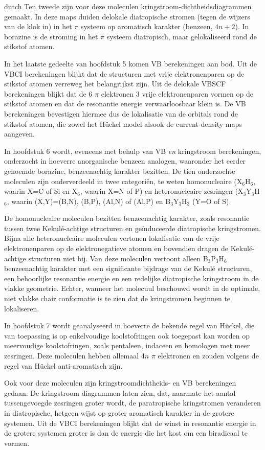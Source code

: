 \begin{otherlanguage*}{dutch}
Ten tweede zijn voor deze moleculen kringstroom-dichtheidsdiagrammen gemaakt. In deze maps duiden delokale diatropische stromen (tegen de wijzers van de klok in) in het $\pi$ systeem op aromatisch karakter (benzeen, $4n+2$). In borazine is de stroming in het $\pi$ systeem diatropisch, maar gelokaliseerd rond de stikstof atomen.

In het laatste gedeelte van hoofdstuk 5 komen VB berekeningen aan bod. Uit de VBCI berekeningen blijkt dat de structuren met vrije elektronenparen op de stikstof atomen verreweg het belangrijkst zijn. Uit de delokale VBSCF berekeningen blijkt dat de 6 $\pi$ elektronen 3 vrije elektronenparen vormen op de stikstof atomen en dat de resonantie energie verwaarloosbaar klein is. De VB berekeningen bevestigen hiermee dus de lokalisatie van de orbitals rond de stikstof atomen, die zowel het H\"uckel model alsook de current-density maps aangeven.

In hoofdstuk 6 wordt, eveneens met behulp van VB \textit{en} kringstroom berekeningen, onderzocht in hoeverre anorganische benzeen analogen, waaronder het eerder genoemde borazine, benzeenachtig karakter bezitten. De tien onderzochte moleculen zijn onderverdeeld in twee categori\"{e}n, te weten homonucleaire (X$_6$H$_6$, waarin X=C of Si en X$_6$, waarin X=N of P) en heteronucleaire zesringen (X$_3$Y$_3$H$_6$, waarin (X,Y)=(B,N), (B,P), (Al,N) of (Al,P) en B$_3$Y$_3$H$_3$ (Y=O of S).

De homonucleaire moleculen bezitten benzeenachtig karakter, zoals resonantie tussen twee Kekul\'{e}-achtige structuren en ge\"{i}nduceerde diatropische kringstromen. Bijna alle heteronucleaire moleculen vertonen lokalisatie van de vrije elektronenparen op de elektronegatieve atomen en bovendien dragen de Kekul\'{e}-achtige structuren niet bij. Van deze moleculen vertoont alleen B$_3$P$_3$H$_6$ benzeenachtig karakter met een significante bijdrage van de Kekul\'{e} structuren, een behoorlijke resonantie energie en een redelijke diatropische kringstroom in de vlakke geometrie. Echter, wanneer het molecuul beschouwd wordt in de optimale, niet vlakke chair conformatie is te zien dat de kringstromen beginnen te lokaliseren. 

In hoofdstuk 7 wordt geanalyseerd in hoeverre de bekende regel van H\"{u}ckel, die van toepassing is op enkelvoudige koolstofringen ook toegepast kan worden op meervoudige koolstofringen, zoals pentaleen, indaceen en homologen met meer zesringen. Deze moleculen hebben allemaal 4$n$ $\pi$ elektronen en zouden volgens de regel van H\"{u}ckel anti-aromatisch zijn.

Ook voor deze moleculen zijn kringstroomdichtheids- en VB berekeningen gedaan. De kringstroom diagrammen laten zien, dat, naarmate het aantal tussengevoegde zesringen groter wordt, de paratropische kringstromen veranderen in diatropische, hetgeen wijst op groter aromatisch karakter in de grotere systemen. Uit de VBCI berekeningen blijkt dat de winst in resonantie energie in de grotere systemen groter is dan de energie die het kost om een biradicaal te vormen.

\end{otherlanguage*}

